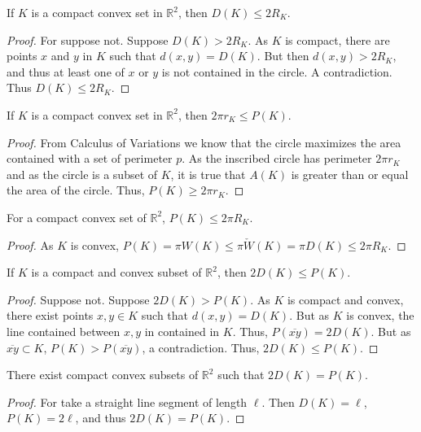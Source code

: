 \documentclass[crop=false,class=article,oneside]{standalone}
\begin{document}
        \begin{theorem}
        If $K$ is a compact convex set in $\mathbb{R}^2$, then $D(K) \leq 2R_K$.
        \end{theorem}
        \begin{proof}
        For suppose not. Suppose $D(K) > 2R_K$. As $K$ is compact, there are points $x$ and $y$ in $K$ such that $d(x,y)=D(K)$. But then $d(x,y)>2R_K$, and thus at least one of $x$ or $y$ is not contained in the circle. A contradiction. Thus $D(K)\leq 2R_K$.
        \end{proof}
        \begin{theorem}
        If $K$ is a compact convex set in $\mathbb{R}^2$, then $2\pi r_K \leq P(K)$.
        \end{theorem}
        \begin{proof}
        From Calculus of Variations we know that the circle maximizes the area contained with a set of perimeter $p$. As the inscribed circle has perimeter $2\pi r_K$ and as the circle is a subset of $K$, it is true that $A(K)$ is greater than or equal the area of the circle. Thus, $P(K)\geq 2\pi r_K$.
        \end{proof}
        \begin{theorem}
        For a compact convex set of $\mathbb{R}^2$, $P(K) \leq 2\pi R_K$.
        \end{theorem}
        \begin{proof}
        As $K$ is convex, $P(K) = \pi W(K) \leq \pi \check{W}(K) = \pi D(K) \leq 2\pi R_K$.
        \end{proof}
        \begin{theorem}
        If $K$ is a compact and convex subset of $\mathbb{R}^2$, then $2D(K)\leq P(K)$.
        \end{theorem}
        \begin{proof}
        Suppose not. Suppose $2D(K) >P(K)$. As $K$ is compact and convex, there exist points $x,y\in K$ such that $d(x,y) = D(K)$. But as $K$ is convex, the line contained between $x,y$ in contained in $K$. Thus, $P(\overline{xy}) = 2D(K)$. But as $\overline{xy}\subset K$, $P(K)>P(\overline{xy})$, a contradiction. Thus, $2D(K) \leq P(K)$.
        \end{proof}
        \begin{theorem}
        There exist compact convex subsets of $\mathbb{R}^2$ such that $2D(K) = P(K)$.
        \end{theorem}
        \begin{proof}
        For take a straight line segment of length $\ell$. Then $D(K) = \ell$, $P(K) = 2\ell$, and thus $2D(K) = P(K)$.
        \end{proof}
\end{document}
